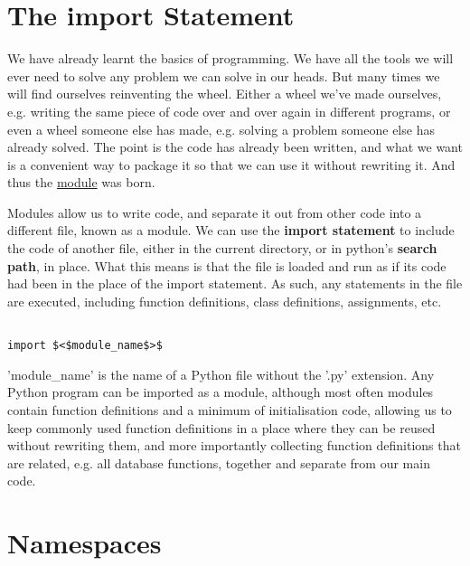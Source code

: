\section{The import Statement}

We have already learnt the basics of programming. We have all the   tools we will ever need to solve any problem we can solve in our heads.   But many times we will find ourselves reinventing the wheel. Either a   wheel we've made ourselves, e.g. writing the same piece of code over   and over again in different programs, or even a wheel someone else has   made, e.g. solving a problem someone else has already solved. The point   is the code has already been written, and what we want is a convenient   way to package it so that we can use it without rewriting it. And thus   the \href{http://docs.python.org/tut.node8.html}{module} was born.

Modules allow us to write code, and separate it out from other code   into a different file, known as a module. We can use the \textbf{import   statement} to include the code of another file, either in the   current directory, or in python's \textbf{search path}, in   place. What this means is that the file is loaded and run as if its   code had been in the place of the import statement. As such, any   statements in the file are executed, including function definitions,   class definitions, assignments, etc.
\begin{lstlisting}

import $<$module_name$>$
\end{lstlisting}

'module\_name' is the name of a Python file without the '.py'   extension. Any Python program can be imported as a module, although   most often modules contain function definitions and a minimum of   initialisation code, allowing us to keep commonly used function   definitions in a place where they can be reused without rewriting them,   and more importantly collecting function definitions that are related,   e.g. all database functions, together and separate from our main   code.

\section{Namespaces}

